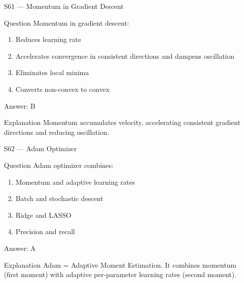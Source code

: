 \documentclass[aspectratio=169,8pt]{beamer}
\begin{document}
	\begin{frame}{S61 --- Momentum in Gradient Descent}
		\begin{block}{Question}
			Momentum in gradient descent:
			\begin{enumerate}
				\item Reduces learning rate
				\item Accelerates convergence in consistent directions and dampens oscillation
				\item Eliminates local minima
				\item Converts non-convex to convex
			\end{enumerate}
		\end{block}
		\begin{exampleblock}{Answer: B}\end{exampleblock}
		\begin{block}{Explanation}
			Momentum accumulates velocity, accelerating consistent gradient directions and reducing oscillation.
		\end{block}
	\end{frame}
	
	\begin{frame}{S62 --- Adam Optimizer}
		\begin{block}{Question}
			Adam optimizer combines:
			\begin{enumerate}
				\item Momentum and adaptive learning rates
				\item Batch and stochastic descent
				\item Ridge and LASSO
				\item Precision and recall
			\end{enumerate}
		\end{block}
		\begin{exampleblock}{Answer: A}\end{exampleblock}
		\begin{block}{Explanation}
			Adam = Adaptive Moment Estimation. It combines momentum (first moment) with adaptive per-parameter learning rates (second moment).
		\end{block}
	\end{frame}
	
\end{document}
